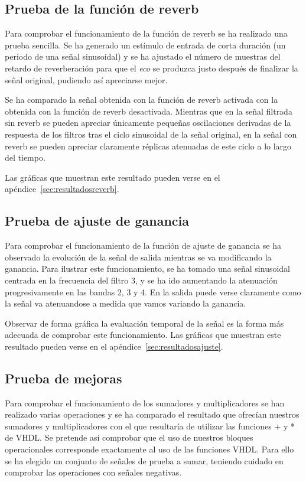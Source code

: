 \documentclass[a4paper,12pt]{article}
\begin{document}
\subsection{Prueba de la función de reverb}
Para comprobar el funcionamiento de la función de reverb se ha realizado una prueba sencilla. Se ha generado un estímulo de entrada de corta duración (un periodo de una señal sinusoidal) y se ha ajustado el número de muestras del retardo de reverberación para que el \emph{eco} se produzca justo después de finalizar la señal original, pudiendo así apreciarse mejor.

Se ha comparado la señal obtenida con la función de reverb activada con la obtenida con la función de reverb desactivada. Mientras que en la señal filtrada sin reverb se pueden apreciar únicamente pequeñas oscilaciones derivadas de la respuesta de los filtros tras el ciclo sinusoidal de la señal original, en la señal con reverb se pueden apreciar claramente réplicas atenuadas de este ciclo a lo largo del tiempo.

Las gráficas que muestran este resultado pueden verse en el apéndice~\ref{sec:resultadosreverb}.


\subsection{Prueba de ajuste de ganancia}
Para comprobar el funcionamiento de la función de ajuste de ganancia se ha observado la evolución de la señal de salida mientras se va modificando la ganancia. Para ilustrar este funcionamiento, se ha tomado una señal sinusoidal centrada en la frecuencia del filtro 3, y se ha ido aumentando la atenuación progresivamente en las bandas 2, 3 y 4. En la salida puede verse claramente como la señal va atenuandose a medida que vamos variando la ganancia.

Observar de forma gráfica la evaluación temporal de la señal es la forma más adecuada de comprobar este funcionamiento. Las gráficas que muestran este resultado pueden verse en el apéndice~\ref{sec:resultadosajuste}.

\subsection{Prueba de mejoras}
Para comprobar el funcionamiento de los sumadores y multiplicadores se han realizado varias operaciones y se ha comparado el resultado que ofrecían nuestros sumadores y multiplicadores con el que resultaría de utilizar las funciones + y * de VHDL. Se pretende así comprobar que el uso de nuestros bloques operacionales corresponde exactamente al uso de las funciones VHDL. Para ello se ha elegido un conjunto de señales de prueba a sumar, teniendo cuidado en comprobar las operaciones con señales negativas.
\end{document}
